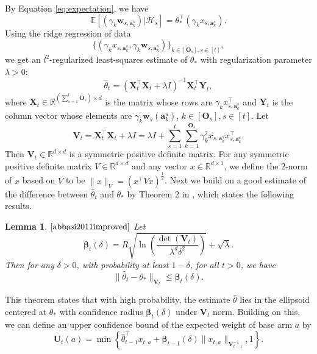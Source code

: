 \documentclass{article}
\newcommand{\bbeta}{\boldsymbol{\beta}}
\newcommand{\EE}{\mathbb{E}}
\newcommand{\RR}{\mathbb{R}}
\newcommand{\ba}{\mathbf{a}}
\newcommand{\bO}{\mathbf{O}}
\newcommand{\bU}{\mathbf{U}}
\newcommand{\bV}{\mathbf{V}}
\newcommand{\bw}{\mathbf{w}}
\newcommand{\bX}{\mathbf{X}}
\newcommand{\bY}{\mathbf{Y}}
\newcommand{\cH}{\mathcal{H}}
\newcommand{\norm}[1]{\| #1 \|}
\newtheorem{lemma}[theorem]{Lemma}%
\begin{document}

By Equation \eqref{eq:expectation}, we have 
$$
  \EE[(\gamma_k \bw_{s,\ba_k^s}) | \cH_{s}] = \theta_*^{\top} (\gamma_k x_{s,\ba_k^s}).
$$
Using the ridge regression of data 
$$
  \{(\gamma_k x_{s,\ba_k^s}, \gamma_k \bw_{s,\ba_k^s})\}_{k \in[\bO_s], s\in[t]},
$$
we get an $l^2$-regularized least-squares estimate of $\theta_*$ with regularization parameter $\lambda > 0$:
\begin{equation}
  \hat{\theta}_t = (\bX_t^{\top}\bX_t + \lambda I)^{-1} \bX_t^{\top} \bY_t,
\end{equation}
where $\bX_t \in \RR^{(\sum_{s=1}^{t}\bO_s) \times d}$ is the matrix whose rows are $\gamma_k x_{s,\ba_k^s}^{\top}$ and $\bY_t$ is the column vector whose elements are $\gamma_k \bw_s(\ba_k^s)$, $k \in[\bO_s], s\in[t]$. Let
$$
  \bV_t = \bX_t^{\top} \bX_t + \lambda I = \lambda I + \sum_{s=1}^{t} \sum_{k=1}^{\bO_s} \gamma_k^2 x_{s,\ba_k^s}x_{s,\ba_k^s}^{\top}.
$$
Then $\bV_t \in \RR^{d \times d}$ is a symmetric positive definite matrix. For any symmetric positive definite matrix $V \in \RR^{d \times d} $ and any vector $x \in \RR^{d \times 1}$, we define the $2$-norm of $x$ based on $V$ to be $\norm{x}_V = (x^{\top} V x)^{\frac{1}{2}}$. Next we build on a good estimate of the difference between $\hat{\theta}_t$ and $\theta_*$ by Theorem 2 in \cite{abbasi2011improved}, which states the following results.

\begin{lemma} $\mathrm{\cite{abbasi2011improved}}$ %
  \label{thm:theta_estimate}
  Let 
  \begin{equation}
    \bbeta_{t}(\delta) = R\sqrt{\ln\left(\frac{\det(\bV_{t})}{\lambda^d \delta^2}\right)} + \sqrt{\lambda}. \label{eq:definebeta}
  \end{equation}
  Then for any $\delta > 0$, with probability at least $1 - \delta$, for all $t > 0$, we have
  \begin{equation}
    \label{eq:estimateTheta}
    \norm{\hat{\theta}_t - \theta_{\ast}}_{\bV_{t}} \leq \bbeta_{t}(\delta).
  \end{equation}
\end{lemma}

This theorem states that with high probability, the estimate $\hat{\theta}$ lies in the ellipsoid centered at $\theta_*$ with confidence radius $\bbeta_t(\delta)$ under $\bV_t$ norm. 
Building on this, we can define an upper confidence bound of the expected weight of base arm $a$ by
\begin{equation}
  \label{eq:defU}
  \bU_t(a) = \min\left\{\hat{\theta}_{t-1}^{\top}x_{t,a} + \bbeta_{t-1}(\delta)\norm{x_{t,a}}_{\bV_{t-1}^{-1}}, 1 \right\}.
\end{equation}
\end{document}
